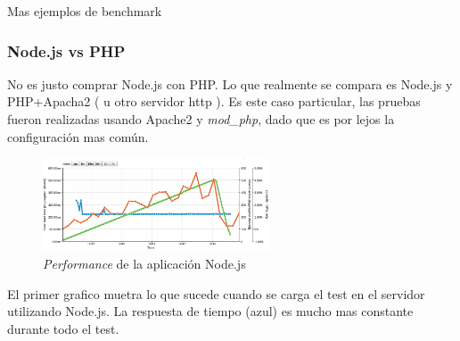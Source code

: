 
Mas ejemplos de benchmark \cite{online_nodejs_java_dzone}


\subsubsection{Node.js vs PHP\cite{online_nodejs_php_loadimpact}}

No es justo comprar Node.js con PHP. Lo que realmente se compara es Node.js y PHP+Apacha2 ( u otro servidor http ). Es este caso particular, las pruebas fueron realizadas usando Apache2 y \textit{mod_php}, dado que es por lejos la configuración mas común. 





\begin{figure}[h!]
	\centering
	\includegraphics[width=0.6\textwidth]{figuras/cap2/node_benchmak_loadimpact.png}
	\caption{\textit{Performance} de la aplicación Node.js}
	\label{cap2:figure:java_benchmark_paypal}
\end{figure}

El primer grafico muetra lo que sucede cuando se carga el test en el servidor utilizando Node.js. La respuesta de tiempo (azul) es mucho mas constante durante todo el test. 

